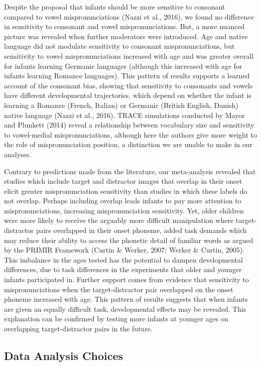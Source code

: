\documentclass[
  english,
  man, noextraspace]{apa6}
\begin{document}
Despite the proposal that infants should be more sensitive to consonant compared to vowel mispronunciations (Nazzi et al., 2016), we found no difference in sensitivity to consonant and vowel mispronunciations. But, a more nuanced picture was revealed when further moderators were introduced. Age and native language did not modulate sensitivity to consonant mispronunciations, but sensitivity to vowel mispronunciations increased with age and was greater overall for infants learning Germanic languages (although this increased with age for infants learning Romance languages). This pattern of results supports a learned account of the consonant bias, showing that sensitivity to consonants and vowels have different developmental trajectories, which depend on whether the infant is learning a Romance (French, Italian) or Germanic (British English, Danish) native language (Nazzi et al., 2016). TRACE simulations conducted by Mayor and Plunkett (2014) reveal a relationship between vocabulary size and sensitivity to vowel-medial mispronunciations, although here the authors give more weight to the role of mispronunciation position, a distinction we are unable to make in our analyses.

Contrary to predictions made from the literature, our meta-analysis revealed that studies which include target and distractor images that overlap in their onset elicit greater mispronunciation sensitivity than studies in which these labels do not overlap. Perhaps including overlap leads infants to pay more attention to mispronunciations, increasing mispronunciation sensitivity. Yet, older children were more likely to receive the arguably more difficult manipulation where target-distractor pairs overlapped in their onset phoneme, added task demands which may reduce their ability to access the phonetic detail of familiar words as argued by the PRIMIR Framework (Curtin \& Werker, 2007; Werker \& Curtin, 2005). This imbalance in the ages tested has the potential to dampen developmental differences, due to task differences in the experiments that older and younger infants participated in. Further support comes from evidence that sensitivity to mispronunciations when the target-distractor pair overlapped on the onset phoneme increased with age. This pattern of results suggests that when infants are given an equally difficult task, developmental effects may be revealed. This explanation can be confirmed by testing more infants at younger ages on overlapping target-distractor pairs in the future.

\hypertarget{data-analysis-choices}{%
\subsection{Data Analysis Choices}\label{data-analysis-choices}}
\end{document}
